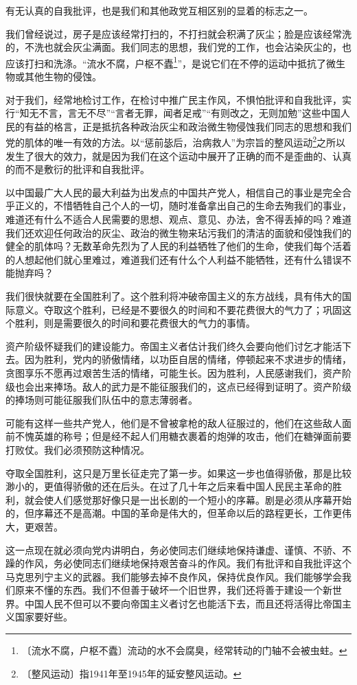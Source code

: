 \documentclass[12pt,UTF-8,openany]{ctexbook}
\begin{document}
\begin{normalsize}
    
    有无认真的自我批评，也是我们和其他政党互相区别的显着的标志之一。
    
    我们曾经说过，房子是应该经常打扫的，不打扫就会积满了灰尘；脸是应该经常洗的，不洗也就会灰尘满面。我们同志的思想，我们党的工作，也会沾染灰尘的，也应该打扫和洗涤。“流水不腐，户枢不蠹\footnote{〔流水不腐，户枢不蠹〕流动的水不会腐臭，经常转动的门轴不会被虫蛀。}”，是说它们在不停的运动中抵抗了微生物或其他生物的侵蚀。
    
    对于我们，经常地检讨工作，在检讨中推广民主作风，不惧怕批评和自我批评，实行“知无不言，言无不尽”“言者无罪，闻者足戒”“有则改之，无则加勉”这些中国人民的有益的格言，正是抵抗各种政治灰尘和政治微生物侵蚀我们同志的思想和我们党的肌体的唯一有效的方法。以“惩前毖后，治病救人”为宗旨的整风运动\footnote{〔整风运动〕指1941年至1945年的延安整风运动。}之所以发生了很大的效力，就是因为我们在这个运动中展开了正确的而不是歪曲的、认真的而不是敷衍的批评和自我批评。
    
    以中国最广大人民的最大利益为出发点的中国共产党人，相信自己的事业是完全合乎正义的，不惜牺牲自己个人的一切，随时准备拿出自己的生命去殉我们的事业，难道还有什么不适合人民需要的思想、观点、意见、办法，舍不得丢掉的吗？难道我们还欢迎任何政治的灰尘、政治的微生物来玷污我们的清洁的面貌和侵蚀我们的健全的肌体吗？无数革命先烈为了人民的利益牺牲了他们的生命，使我们每个活着的人想起他们就心里难过，难道我们还有什么个人利益不能牺牲，还有什么错误不能抛弃吗？
    
    我们很快就要在全国胜利了。这个胜利将冲破帝国主义的东方战线，具有伟大的国际意义。夺取这个胜利，已经是不要很久的时间和不要花费很大的气力了；巩固这个胜利，则是需要很久的时间和要花费很大的气力的事情。
    
    资产阶级怀疑我们的建设能力。帝国主义者估计我们终久会要向他们讨乞才能活下去。因为胜利，党内的骄傲情绪，以功臣自居的情绪，停顿起来不求进步的情绪，贪图享乐不愿再过艰苦生活的情绪，可能生长。因为胜利，人民感谢我们，资产阶级也会出来捧场。敌人的武力是不能征服我们的，这点已经得到证明了。资产阶级的捧场则可能征服我们队伍中的意志薄弱者。
    
    可能有这样一些共产党人，他们是不曾被拿枪的敌人征服过的，他们在这些敌人面前不愧英雄的称号；但是经不起人们用糖衣裹着的炮弹的攻击，他们在糖弹面前要打败仗。我们必须预防这种情况。
    
    夺取全国胜利，这只是万里长征走完了第一步。如果这一步也值得骄傲，那是比较渺小的，更值得骄傲的还在后头。在过了几十年之后来看中国人民民主革命的胜利，就会使人们感觉那好像只是一出长剧的一个短小的序幕。剧是必须从序幕开始的，但序幕还不是高潮。中国的革命是伟大的，但革命以后的路程更长，工作更伟大，更艰苦。
    
    这一点现在就必须向党内讲明白，务必使同志们继续地保持谦虚、谨慎、不骄、不躁的作风，务必使同志们继续地保持艰苦奋斗的作风。我们有批评和自我批评这个马克思列宁主义的武器。我们能够去掉不良作风，保持优良作风。我们能够学会我们原来不懂的东西。我们不但善于破坏一个旧世界，我们还将善于建设一个新世界。中国人民不但可以不要向帝国主义者讨乞也能活下去，而且还将活得比帝国主义国家要好些。
    
\end{normalsize}
\end{document}
